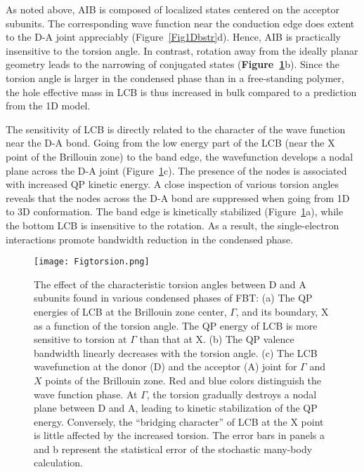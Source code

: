 \documentclass[journal = jpclcd]{achemso}
\begin{document}
As noted above, AIB is composed of  localized states  centered on the acceptor subunits. The corresponding wave function near the conduction edge does extent to the D-A joint appreciably (Figure~\ref{Fig1Dbstr}d). Hence, AIB is practically insensitive to the torsion angle.  In contrast, rotation away from the ideally planar geometry leads to the narrowing of conjugated states  (\textbf{Figure~\ref{Figtorsion}}b). Since the torsion angle is larger in the condensed phase than in a free-standing polymer, the hole effective mass in LCB is thus increased in bulk compared to a prediction from the 1D model.

The sensitivity of LCB is directly related to the character of the wave function near the D-A bond. Going from the low energy part of the LCB (near the X point of the Brillouin zone) to the band edge, the wavefunction develops a nodal plane across the D-A joint (Figure~\ref{Figtorsion}c). The presence of the nodes is associated with increased QP kinetic energy. A close inspection of various torsion angles reveals that the nodes across the D-A bond are suppressed when going from 1D to 3D conformation. The band edge is kinetically stabilized (Figure~\ref{Figtorsion}a), while the bottom LCB is insensitive to the rotation. As a result, the single-electron interactions promote bandwidth reduction in the condensed phase.

 \begin{figure}
    \centering
    \texttt{[image: Figtorsion.png]}
    \caption{The effect of the characteristic torsion angles between D and A subunits found in various condensed phases of FBT: (a) The QP energies of LCB at the Brillouin zone center, $\Gamma$, and its boundary, X as a function of the torsion angle. The QP energy of LCB is more sensitive to torsion at $\Gamma$   than that at X. (b) The QP valence bandwidth linearly decreases with the torsion angle. (c) The LCB wavefunction at the donor (D) and the acceptor (A) joint for $\Gamma$ and $X$ points of the Brillouin zone. Red and blue colors distinguish the wave function phase. At $\Gamma$, the torsion gradually destroys a nodal plane between D and A, leading to kinetic stabilization of the QP energy. Conversely, the ``bridging character'' of LCB at the X point is little affected by the increased torsion. The error bars in panels a and b represent the statistical error of the stochastic many-body calculation.}
    \label{Figtorsion}
\end{figure}
\end{document}
